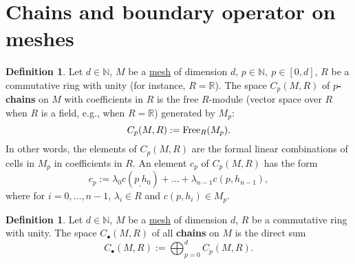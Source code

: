 \documentclass[fleqn]{article}
\theoremstyle{definition}
\newtheorem{definition}[theorem]{Definition}
\newcommand{\N}{\mathbb{N}}
\newcommand{\R}{\mathbb{R}}
\begin{document}
\section{Chains and boundary operator on meshes}

\begin{definition}
  \label{idec:mesh_chain:definition}
  Let
    $d \in \N$,
    $M$ be a \hyperref[idec:mesh:definition]{mesh} of dimension $d$,
    $p \in \N,\ p \in [0, d]$,
    $R$ be a commutative ring with unity (for instance, $R = \R$).
  The space $C_p(M, R)$ of \textbf{$p$-chains}
  on $M$ with coefficients in $R$ is the free $R$-module
  (vector space over $R$ when $R$ is a field, e.g., when $R = \R$)
  generated by $M_p$:
  \begin{equation}
    C_p(M, R) := {\rm Free}_R(M_p).
  \end{equation}
  In other words, the elements of $C_p(M, R)$ are the formal linear combinations
  of cells in $M_p$ in coefficients in $R$.
  An element $c_p$ of $C_p(M, R)$ has the form
  \begin{equation}
    c_p := \lambda_0 c(p_, h_0) + ... + \lambda_{n - 1} c(p, h_{n - 1}),
  \end{equation}
  where for $i = 0, ..., n - 1$, $\lambda_i \in R$ and $c(p, h_i) \in M_p$.
\end{definition}

\begin{definition}
  Let
    $d \in \N$,
    $M$ be a \hyperref[idec:mesh:definition]{mesh} of dimension $d$,
    $R$ be a commutative ring with unity.
  The space $C_\bullet(M, R)$ of all \textbf{chains} on $M$ is the direct sum
  \begin{equation}
    C_\bullet(M, R) := \bigoplus_{p = 0}^d
    \hyperref[idec:mesh_chain:definition]{C_p(M, R)}.
  \end{equation}
\end{definition}
\end{document}
